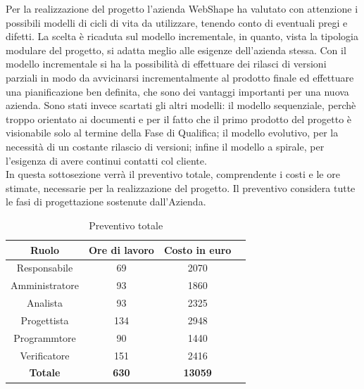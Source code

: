 Per la realizzazione del progetto l'azienda WebShape ha valutato con attenzione i possibili modelli di cicli di vita da utilizzare, tenendo conto di eventuali pregi e difetti. 
La scelta \`e ricaduta sul modello incrementale, in quanto, vista la tipologia modulare del progetto, si adatta meglio alle esigenze dell'azienda stessa. Con il modello incrementale si ha la possibilit\`a di effettuare dei rilasci di versioni parziali in modo da avvicinarsi incrementalmente al prodotto finale ed effettuare una pianificazione ben definita, che sono dei vantaggi importanti per una nuova azienda. Sono stati invece scartati gli altri modelli: il modello sequenziale, perch\`e troppo orientato ai documenti e per il fatto che il primo prodotto del progetto \` e visionabile solo al termine della Fase di Qualifica; il modello evolutivo, per la necessit\`a di un costante rilascio di versioni; infine il modello a spirale, per l'esigenza di avere continui contatti col cliente.\\
In questa sottosezione verr\` a il preventivo totale, comprendente i costi e le ore stimate, necessarie per la realizzazione del progetto. Il preventivo considera tutte le fasi di progettazione sostenute dall'Azienda.

\begin{table}[h]
	\begin{center}
		  \begin{tabular}{|c|c|c|c|}
		 \hline 
		 \textbf{Ruolo} & \textbf{Ore di lavoro} & \textbf{Costo in euro}\\
		 \hline
		Responsabile & 69 & 2070 \\
		Amministratore & 93 & 1860\\
		Analista & 93 & 2325\\
		Progettista & 134 & 2948\\
		Programmtore & 90 & 1440 \\
		Verificatore & 151 & 2416\\
        \hline
        \textbf{Totale} & \textbf{630} & \textbf{13059}\\
		\hline
		\end{tabular}
	\caption{Preventivo totale} 
	\label{tab:tabella_preventivo}
	\end{center}	
\end{table}


